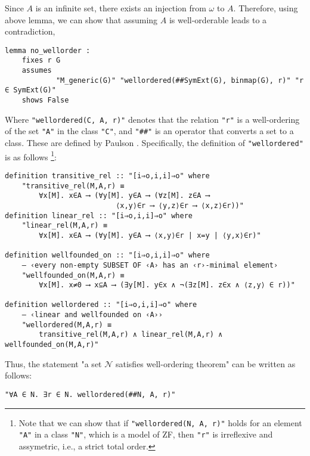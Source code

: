 \documentclass{report}
\newenvironment{isaframe}{\begin{mdframed}[topline=false, rightline=false, bottomline=false]}{\end{mdframed}}
\begin{document}
Since $A$ is an infinite set, there exists an injection from $\omega$ to $A$.
Therefore, using above lemma, we can show that assuming $A$ is well-orderable leads to a contradiction,

\begin{isaframe}
\begin{verbatim}
lemma no_wellorder : 
    fixes r G
    assumes 
            "M_generic(G)" "wellordered(##SymExt(G), binmap(G), r)" "r ∈ SymExt(G)" 
    shows False
\end{verbatim}
\end{isaframe}

Where \texttt{"wellordered(C, A, r)"} denotes that 
the relation \texttt{"r"} is a well-ordering of the set \texttt{"A"} in the class \texttt{"C"}, 
and \texttt{"\#\#"} is an operator that converts a set to a class.
These are defined by Paulson \cite{paulson_AC_consistency}.
Specifically, the definition of \texttt{"wellordered"} is as follows
\footnote{
Note that we can show that 
if \texttt{"wellordered(N, A, r)"} holds for an element \texttt{"A"} in a class \texttt{"N"}, which is a model of ZF,
then \texttt{"r"} is irreflexive and assymetric, i.e., a strict total order.
}:
\begin{isaframe}
\begin{verbatim}
definition transitive_rel :: "[i⇒o,i,i]⇒o" where
    "transitive_rel(M,A,r) ≡ 
        ∀x[M]. x∈A ⟶ (∀y[M]. y∈A ⟶ (∀z[M]. z∈A ⟶ 
                          ⟨x,y⟩∈r ⟶ ⟨y,z⟩∈r ⟶ ⟨x,z⟩∈r))"
definition linear_rel :: "[i⇒o,i,i]⇒o" where
    "linear_rel(M,A,r) ≡ 
        ∀x[M]. x∈A ⟶ (∀y[M]. y∈A ⟶ ⟨x,y⟩∈r | x=y | ⟨y,x⟩∈r)"

definition wellfounded_on :: "[i⇒o,i,i]⇒o" where
    ― ‹every non-empty SUBSET OF ‹A› has an ‹r›-minimal element›
    "wellfounded_on(M,A,r) ≡ 
        ∀x[M]. x≠0 ⟶ x⊆A ⟶ (∃y[M]. y∈x ∧ ¬(∃z[M]. z∈x ∧ ⟨z,y⟩ ∈ r))"
        
definition wellordered :: "[i⇒o,i,i]⇒o" where
    ― ‹linear and wellfounded on ‹A››
    "wellordered(M,A,r) ≡ 
        transitive_rel(M,A,r) ∧ linear_rel(M,A,r) ∧ wellfounded_on(M,A,r)"
\end{verbatim}
\end{isaframe}

Thus, the statement "a set $\mathcal{N}$ satisfies well-ordering theorem" can be written as follows:
\begin{isaframe}
\begin{verbatim}
"∀A ∈ N. ∃r ∈ N. wellordered(##N, A, r)"
\end{verbatim}
\end{isaframe}
\end{document}

